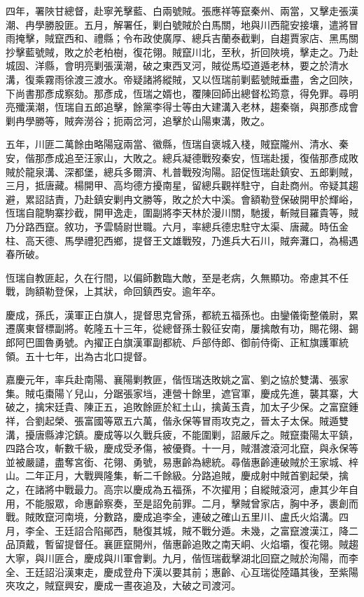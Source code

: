 \begin{pinyinscope}
四年，署陜甘總督，赴寧羌擊藍、白兩號賊。張應祥等竄秦州、兩當，又擊走張漢潮、冉學勝股匪。五月，解署任，剿白號賊於白馬關，地與川西龍安接壤，遣將冒雨掩擊，賊竄西和、禮縣；令布政使廣厚、總兵吉蘭泰截剿，自趨賈家店、黑馬關抄擊藍號賊，敗之於老柏樹，復花翎。賊竄川北，至秋，折回陜境，擊走之。乃赴城固、洋縣，會明亮剿張漢潮，破之東西叉河，賊從馬埡道遁老林，要之於清水溝，復乘霧雨徐渡三渡水。帝疑諸將縱賊，又以恆瑞前剿藍號賊垂盡，舍之回陜，下尚書那彥成察劾。那彥成，恆瑞之婿也，覆陳回師出總督松筠意，得免罪。尋明亮殲漢潮，恆瑞自五郎追擊，餘黨李得士等由大建溝入老林，趨秦嶺，與那彥成會剿冉學勝等，賊奔澇谷；扼兩岔河，追擊於山陽東溝，敗之。

五年，川匪二萬餘由略陽寇兩當、徽縣，恆瑞自褒城入棧，賊竄隴州、清水、秦安，偕那彥成追至汪家山，大敗之。總兵凝德戰歿秦安，恆瑞赴援，復偕那彥成敗賊於龍泉溝、深都堡，總兵多爾濟、札普戰歿洵陽。詔促恆瑞赴鎮安、五郎剿賊，三月，抵唐藏。楊開甲、高均德方擾南星，留總兵觀祥駐守，自赴商州。帝疑其趨避，累詔詰責，乃赴鎮安剿冉文勝等，敗之於大中溪。會額勒登保破開甲於輝峪，恆瑞自龍駒寨抄截，開甲逸走，圍副將李天林於漫川關，馳援，斬賊目羅貴等，賊乃分路西竄。敘功，予雲騎尉世職。六月，率總兵德忠駐守太渠、唐藏。時伍金柱、高天德、馬學禮犯西鄉，提督王文雄戰歿，乃進兵大石川，賊奔灘口，為楊遇春所破。

恆瑞自教匪起，久在行間，以偏師數臨大敵，至是老病，久無顯功。帝慮其不任戰，詢額勒登保，上其狀，命回鎮西安。逾年卒。

慶成，孫氏，漢軍正白旗人，提督思克曾孫，都統五福孫也。由鑾儀衛整儀尉，累遷廣東督標副將。乾隆五十三年，從總督孫士毅征安南，屢擒敵有功，賜花翎、錫郎阿巴圖魯勇號。內擢正白旗漢軍副都統、戶部侍郎、御前侍衛、正紅旗護軍統領。五十七年，出為古北口提督。

嘉慶元年，率兵赴南陽、襄陽剿教匪，偕恆瑞迭敗姚之富、劉之協於雙溝、張家集。賊屯棗陽丫兒山，分踞張家垱，連營十餘里，遮官軍，慶成先進，襲其寨，大破之，擒宋廷貴、陳正五，追敗餘匪於紅土山，擒黃玉貴，加太子少保。之富竄鍾祥，合劉起榮、張富國等眾五六萬，偕永保等冒雨攻克之，晉太子太保。賊遁雙溝，擾唐縣滹沱鎮。慶成等以久戰兵疲，不能圍剿，詔嚴斥之。賊竄棗陽太平鎮，四路合攻，斬數千級，慶成受矛傷，被優賚。十一月，賊潛渡滾河北竄，與永保等並被嚴譴，盡奪宮銜、花翎、勇號，易惠齡為總統。尋偕惠齡連破賊於王家城、梓山。二年正月，大戰興隆集，斬二千餘級。分路追賊，慶成射中賊首劉起榮，擒之，在諸將中戰最力。高宗以慶成為五福孫，不次擢用；自縱賊滾河，慮其少年自用，不能服眾，命惠齡察奏，至是詔免前罪。二月，擊賊曾家店，胸中矛，裹創而戰。賊敗竄河南境，分數路，慶成追李全，連破之確山五里川、盧氏火焰溝。四月，李全、王廷詔合陷鄖西，馳復其城，賊不戰分遁。未幾，之富竄渡漢江，降二品頂戴，暫留提督任。襄匪竄開州，偕惠齡追敗之南天峒、火焰壩，復花翎。賊趨大寧，與川匪合，慶成與川軍會剿。九月，偕恆瑞截擊湖北回竄之賊於洵陽，而李全、王廷詔沿漢東走，慶成登舟下漢以要其前；惠齡、心互瑞從陸躡其後，至紫陽夾攻之，賊竄興安，慶成一晝夜追及，大破之司渡河。


\end{pinyinscope}
